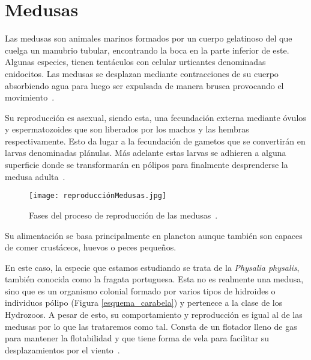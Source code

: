 

\section{Medusas}
Las medusas son animales marinos formados por un cuerpo gelatinoso del que cuelga un manubrio tubular, encontrando la boca en la parte inferior de este. Algunas especies, tienen tentáculos con celular urticantes denominadas cnidocitos. Las medusas se desplazan mediante contracciones de su cuerpo absorbiendo agua para luego ser expulsada de manera brusca provocando el movimiento~\cite{wiki:medusas}.

Su reproducción es asexual, siendo esta, una fecundación externa mediante óvulos y espermatozoides que son liberados por los machos y las hembras respectivamente. Esto da lugar a la fecundación de gametos que se convertirán en larvas denominadas plánulas. Más adelante estas larvas se adhieren a alguna superficie donde se transformarán en pólipos para finalmente desprenderse la medusa adulta~\cite{noauthor_reproduccion_2016}.


\begin{figure}%
	\centering
	\texttt{[image: reproducciónMedusas.jpg]}
	\caption[Fases del proceso de reproducción de las medusas]{Fases del proceso de reproducción de las medusas~\cite{reproduccionMedusas}.}
	\label{fases_medusas}
\end{figure}


Su alimentación se basa principalmente en plancton aunque también son capaces de comer crustáceos, huevos o peces pequeños.

En este caso, la especie que estamos estudiando se trata de la \emph{Physalia physalis}, también conocida como la fragata portuguesa. Esta no es realmente una medusa, sino que es un organismo colonial formado por varios tipos de hidroides o individuos pólipo (Figura \ref{esquema_carabela}) y pertenece a la clase de los Hydrozoos. A pesar de esto, su comportamiento y reproducción es igual al de las medusas por lo que las trataremos como tal.
Consta de un flotador lleno de gas para mantener la flotabilidad y que tiene forma de vela para facilitar su desplazamientos por el viento~\cite{physalia}.

